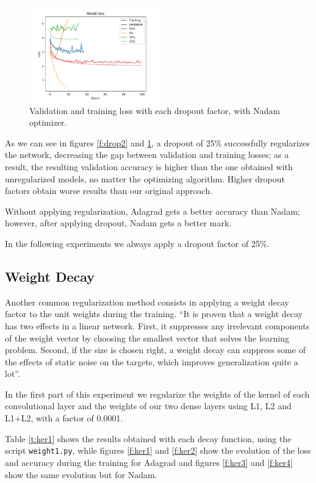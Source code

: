\documentclass[]{article}
\begin{document}
\begin{figure}[H]
	\centering
	\includegraphics[width=0.5\textwidth]{dropout_nadam_loss}
	\caption{Validation and training loss with each dropout factor, with Nadam optimizer.}
	\label{f:drop3}
\end{figure}

As we can see in figures \ref{f:drop2} and \ref{f:drop3}, a dropout of 25\% successfully regularizes the network, decreasing the gap between validation and training losses; as a result, the resulting validation accuracy is higher than the one obtained with unregularized models, no matter the optimizing algorithm. Higher dropout factors obtain worse results than our original approach.

Without applying regularization, Adagrad gets a better accuracy than Nadam; however, after applying dropout, Nadam gets a better mark.

In the following experiments we always apply a dropout factor of 25\%.

\subsection{Weight Decay}

Another common regularization method consists in applying a weight decay factor to the unit weights during the training. \cite{krogh1992simple} ``It is proven that a weight decay has two effects in a linear network. First, it suppresses any irrelevant components of the weight vector by choosing the smallest vector that solves the learning problem. Second, if the size is chosen right, a weight decay can suppress some of the effects of static noise on the targets, which improves generalization quite a lot''.

In the first part of this experiment we regularize the weights of the kernel of each convolutional layer and the weights of our two dense layers using L1, L2 and L1+L2, with a factor of 0.0001.

Table \ref{t:ker1} shows the results obtained with each decay function, using the script \texttt{weight1.py}, while figures \ref{f:ker1} and \ref{f:ker2} show the evolution of the loss and accuracy during the training for Adagrad and figures \ref{f:ker3} and \ref{f:ker4} show the same evolution but for Nadam.
\end{document}
